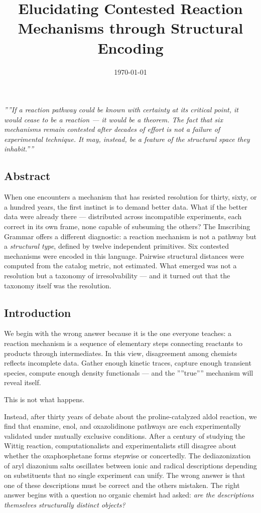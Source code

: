 \documentclass[12pt,a4paper]{article}
\begin{document}
\title{Elucidating Contested Reaction Mechanisms through Structural Encoding}
\date{\today}

\maketitle

\emph{''''If a reaction pathway could be known with certainty at its critical point, it would cease to be a reaction --- it would be a theorem. The fact that six mechanisms remain contested after decades of effort is not a failure of experimental technique. It may, instead, be a feature of the structural space they inhabit.''''}

\subsection{Abstract}

When one encounters a mechanism that has resisted resolution for thirty, sixty, or a hundred years, the first instinct is to demand better data. What if the better data were already there --- distributed across incompatible experiments, each correct in its own frame, none capable of subsuming the others? The Imscribing Grammar offers a different diagnostic: a reaction mechanism is not a pathway but a \emph{structural type}, defined by twelve independent primitives. Six contested mechanisms were encoded in this language. Pairwise structural distances were computed from the catalog metric, not estimated. What emerged was not a resolution but a taxonomy of irresolvability --- and it turned out that the taxonomy itself was the resolution.

\subsection{Introduction}

We begin with the wrong answer because it is the one everyone teaches: a reaction mechanism is a sequence of elementary steps connecting reactants to products through intermediates. In this view, disagreement among chemists reflects incomplete data. Gather enough kinetic traces, capture enough transient species, compute enough density functionals --- and the ''''true'''' mechanism will reveal itself.

This is not what happens.

Instead, after thirty years of debate about the proline-catalyzed aldol reaction, we find that enamine, enol, and oxazolidinone pathways are each experimentally validated under mutually exclusive conditions. After a century of studying the Wittig reaction, computationalists and experimentalists still disagree about whether the oxaphosphetane forms stepwise or concertedly. The dediazonization of aryl diazonium salts oscillates between ionic and radical descriptions depending on substituents that no single experiment can unify. The wrong answer is that one of these descriptions must be correct and the others mistaken. The right answer begins with a question no organic chemist had asked: \emph{are the descriptions themselves structurally distinct objects?}
\end{document}
